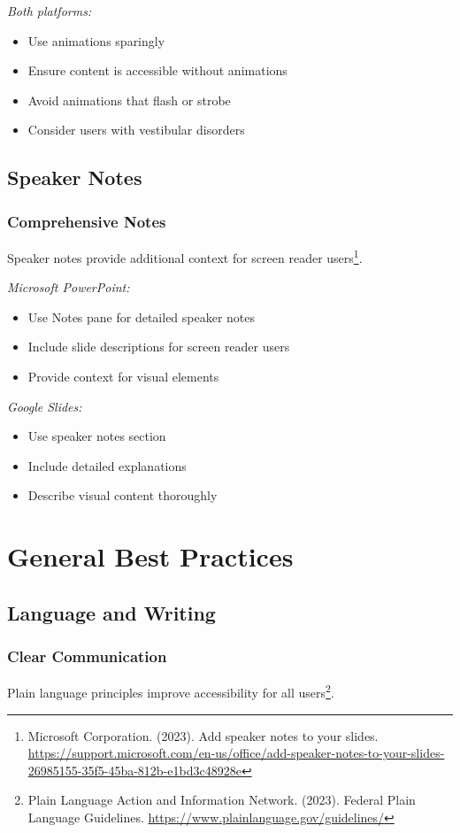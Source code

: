 \emph{Both platforms:}
\begin{itemize}
\item Use animations sparingly
\item Ensure content is accessible without animations
\item Avoid animations that flash or strobe
\item Consider users with vestibular disorders
\end{itemize}

\subsection{Speaker Notes}

\subsubsection{Comprehensive Notes}
Speaker notes provide additional context for screen reader users\footnote{Microsoft Corporation. (2023). Add speaker notes to your slides. \url{https://support.microsoft.com/en-us/office/add-speaker-notes-to-your-slides-26985155-35f5-45ba-812b-e1bd3c48928e}}.

\emph{Microsoft PowerPoint:}
\begin{itemize}
\item Use Notes pane for detailed speaker notes
\item Include slide descriptions for screen reader users
\item Provide context for visual elements
\end{itemize}

\emph{Google Slides:}
\begin{itemize}
\item Use speaker notes section
\item Include detailed explanations
\item Describe visual content thoroughly
\end{itemize}

\section{General Best Practices}
\label{sec:general-best-practices}

\subsection{Language and Writing}

\subsubsection{Clear Communication}
Plain language principles improve accessibility for all users\footnote{Plain Language Action and Information Network. (2023). Federal Plain Language Guidelines. \url{https://www.plainlanguage.gov/guidelines/}}.

